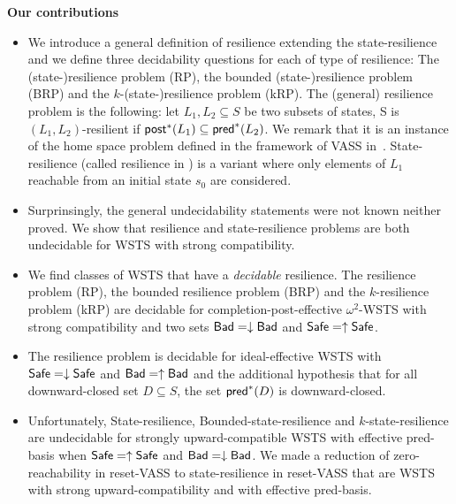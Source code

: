 \noindent
{\bf Our contributions}
\begin{itemize}
\item We introduce a general definition of resilience extending the state-resilience \cite{DBLP:journals/corr/PrasadZ16,DBLP:journals/corr/abs-2108-00889,DBLP:conf/gg/Ozkan22} and we define three decidability questions for each of type of resilience: The (state-)resilience problem (RP), the bounded (state-)resilience problem (BRP)
and the $k$-(state-)resilience problem (kRP). The (general) resilience problem is the following: let $L_1,L_2 \subseteq S$ be two subsets of states, S is $(L_1,L_2)$-resilient if $\textsf{post}^*(L_1)	\subseteq \textsf{pred}^*(L_2)$. We remark that it is an instance of the home space problem defined in the framework of VASS in~\cite{DBLP:journals/corr/abs-2207-02697, memmi2023invariants}.
State-resilience (called resilience in \cite{DBLP:journals/corr/PrasadZ16,DBLP:journals/corr/abs-2108-00889,DBLP:conf/gg/Ozkan22}) is a variant where only elements of $L_1$ reachable from an initial state $s_0$ are considered.

\item Surprinsingly, the general undecidability statements were not known neither proved. We show that resilience and state-resilience problems are both undecidable for WSTS with strong compatibility. 


\item We find classes of WSTS that have a \emph{decidable} resilience. The resilience problem (RP), the bounded resilience problem (BRP)
and the $k$-resilience problem (kRP) are decidable for completion-post-effective $\omega^2$-WSTS with strong compatibility and two sets $\textsf{Bad} = \downarrow \textsf{Bad}$ and $\textsf{Safe} = \uparrow \textsf{Safe}$.

\item The resilience problem is decidable for ideal-effective WSTS with 
$\textsf{Safe}=\downarrow \textsf{Safe}$
and $\textsf{Bad}=\uparrow \textsf{Bad}$
and
the additional hypothesis that
for all downward-closed set $D \subseteq S$, the set $\textsf{pred}^*(D)$ is downward-closed.

\item Unfortunately, {\sc State-resilience},
{\sc Bounded-state-resilience} and
{\sc $k$-state-resilience}
are undecidable for strongly upward-compatible WSTS with effective pred-basis
when
$\textsf{Safe}=\uparrow \textsf{Safe}$
and $\textsf{Bad}=\downarrow \textsf{Bad}$. We made a reduction of zero-reachability in reset-VASS to state-resilience in reset-VASS that are WSTS with strong upward-compatibility and with effective pred-basis.


\end{itemize}
